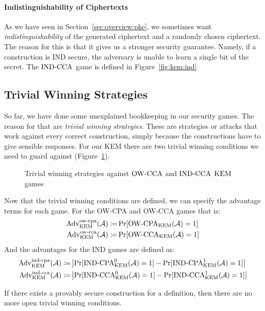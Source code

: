 \paragraph{Indistinguishability of Ciphertexts}
As we have seen in Section~\ref{sec:overview:pke}, we sometimes want \emph{indistinguishability} of the generated ciphertext and a randomly chosen ciphertext.
The reason for this is that it gives us a stronger security guarantee. 
Namely, if a construction is IND secure, the adversary is unable to learn a single bit of the secret.
The ${\mathrm{IND}\text{-}\mathrm{CCA}}$ game is defined in Figure~\ref{fig:kem:ind}

\subsection{Trivial Winning Strategies}
So far, we have done some unexplained bookkeeping in our security games. The reason for that are \emph{trivial winning strategies}.
These are strategies or attacks that work against every correct construction, simply because the constructions have to give sensible responses.
For our KEM there are two trivial winning conditions we need to guard against (Figure~\ref{kem:triv}).

\begin{figure}[!ht]%
    \centering
    
    \caption{Trivial winning strategies against ${\mathrm{OW}\text{-}\mathrm{CCA}}$ and ${\mathrm{IND}\text{-}\mathrm{CCA}}$ $\mathrm{KEM}$ games}
    \label{kem:triv}
\end{figure}

Now that the trivial winning conditions are defined, we can specify the advantage terms for each game.
For the OW-CPA and OW-CCA games that is:
\begin{align*}
    \mathrm{Adv}_{\mathrm{KEM}}^{\mathrm{ow}\text{-}\mathrm{cpa}}(\mathcal{A})\coloneqq&\Pr[{\mathrm{OW}\text{-}\mathrm{CPA}}_{\mathrm{KEM}}(\mathcal{A})=1]\\
    \mathrm{Adv}_{\mathrm{KEM}}^{\mathrm{ow}\text{-}\mathrm{cca}}(\mathcal{A})\coloneqq&\Pr[{\mathrm{OW}\text{-}\mathrm{CCA}}_{\mathrm{KEM}}(\mathcal{A})=1]
\end{align*}
And the advantages for the IND games are defined as:
\begin{align*}
    \mathrm{Adv}_{\mathrm{KEM}}^{\mathrm{ind}\text{-}\mathrm{cpa}}(\mathcal{A})\coloneqq&\left|\Pr[{\mathrm{IND}\text{-}\mathrm{CPA}}_{\mathrm{KEM}}^0(\mathcal{A})=1]-\Pr[{\mathrm{IND}\text{-}\mathrm{CPA}}_{\mathrm{KEM}}^1(\mathcal{A})=1]\right|\\
    \mathrm{Adv}_{\mathrm{KEM}}^{\mathrm{ind}\text{-}\mathrm{cca}}(\mathcal{A})\coloneqq&\left|\Pr[{\mathrm{IND}\text{-}\mathrm{CCA}}_{\mathrm{KEM}}^0(\mathcal{A})=1]-\Pr[{\mathrm{IND}\text{-}\mathrm{CCA}}_{\mathrm{KEM}}^1(\mathcal{A})=1]\right|
\end{align*}

If there exists a provably secure construction for a definition, then there are no more open trivial winning conditions.